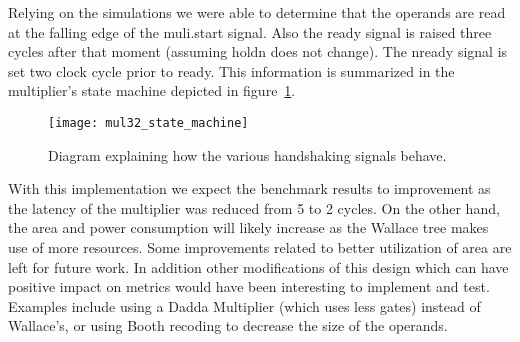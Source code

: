 Relying on the simulations we were able to determine that the operands are read at the falling edge of the muli.start signal. Also the ready signal is raised three cycles after that moment (assuming holdn does not change). The nready signal is set two clock cycle prior to ready.
This information is summarized in the multiplier's state machine depicted in figure~\ref{fig:mul32_state_machine}.

\begin{figure}[H]
\centering
\texttt{[image: mul32\_state\_machine]}
\caption{Diagram explaining how the various handshaking signals behave.}
\label{fig:mul32_state_machine}
\end{figure}



With this implementation we expect the benchmark results to improvement as the latency of the multiplier was reduced from 5 to 2 cycles. On the other hand, the area and power consumption will likely increase as the Wallace tree makes use of more resources. Some improvements related to better utilization of area are left for future work. In addition other modifications of this design which can have positive impact on metrics would have been interesting to implement and test. Examples include using a Dadda Multiplier (which uses less gates) instead of Wallace's, or using Booth recoding to decrease the size of the operands.


